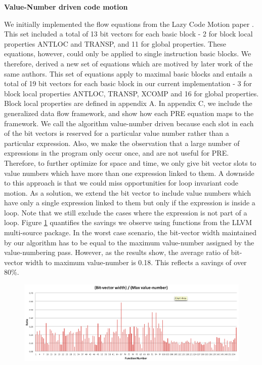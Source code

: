 \documentclass[10pt,twoside]{report}
\begin{document}
\newpage

\begin{flushleft}
\textbf{\large{Value-Number driven code motion}}
\end{flushleft}
We initially implemented the flow equations from the Lazy Code Motion paper \cite{Knoop}.
This set included a total of 13 bit vectors for each basic block - 2 for block local
properties ANTLOC and TRANSP, and 11 for global properties. These equations,
           however, could only be applied to single instruction basic blocks.
           We therefore, derived a new set of equations which are motived by
           later work\cite{Knoop2} of the same authors.
           This set of equations apply to maximal basic blocks and
           entails a total of 19 bit vectors for each basic block in our
           current implementation - 3 for block local properties ANTLOC,
           TRANSP, XCOMP and 16 for global properties.  Block local properties are 
	  defined in appendix A. In appendix C, we include the generalized data flow 
	  framework, and show how each PRE equation maps to the framework. 
	  We call the algorithm value-number driven because each
           slot in each of the bit vectors is reserved for a particular value
           number rather than a particular expression. Also, we make the
           observation that a large number of expressions in the program only
           occur once, and are not useful for PRE. Therefore, to further optimize
           for space and time, we only give bit vector slots to value numbers
           which have more than one expression linked to them. A downside to this
approach is that we could miss opportunities for loop invariant code motion. As a
      solution, we extend the bit vector to include value numbers which have
      only a single expression linked to them but only if the expression is
      inside a loop. Note that we still exclude the cases where the expression
      is not part of a loop. Figure \ref{fig:barC} quantifies the savings we observe using functions from the LLVM
multi-source package. In the worst case scenario, the bit-vector width maintained by our 
algorithm has to be equal to the maximum value-number assigned by the value-numbering pass. However, as 
the results show, the average ratio of bit-vector width to maximum value-number is 0.18. This reflects a savings of
over 80\%.

\begin{figure}[htbp]
\centering
  \includegraphics[scale=0.40]{Figs/barC} 
 \caption{\label{fig:barC}} 
\end{figure}
\end{document}
